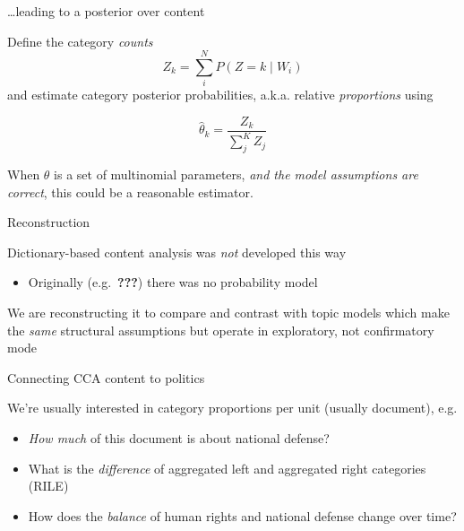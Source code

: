 \documentclass{hertieteaching}
\begin{document}
\begin{frame}{\ldots leading to a posterior over content}
\protect\hypertarget{leading-to-a-posterior-over-content}{}

Define the category \emph{counts} \[
Z_k = \sum^N_{i} P(Z = k \mid W_i)
\] and estimate category posterior probabilities, a.k.a. relative
\emph{proportions} using

\[
\hat{\theta}_k = \frac{Z_k}{\sum^K_{j} Z_j}
\]

\pause

When \(\theta\) is a set of multinomial parameters, \emph{and the model
assumptions are correct}, this could be a reasonable estimator.

\end{frame}

\begin{frame}{Reconstruction}
\protect\hypertarget{reconstruction}{}

Dictionary-based content analysis was \emph{not} developed this way

\begin{itemize}
\item
  Originally (e.g.~{\textbf{???}}) there was no probability model
\end{itemize}

\pause

We are reconstructing it to compare and contrast with topic models which
make the \emph{same} structural assumptions but operate in exploratory,
not confirmatory mode

\end{frame}

\begin{frame}{Connecting CCA content to politics}
\protect\hypertarget{connecting-cca-content-to-politics}{}

We're usually interested in category proportions per unit (usually
document), e.g.

\begin{itemize}
\item
  \emph{How much} of this document is about national defense?\item
  What is the \emph{difference} of aggregated left and aggregated right
  categories (RILE)\item
  How does the \emph{balance} of human rights and national defense
  change over time?
\end{itemize}

\end{frame}
\end{document}
